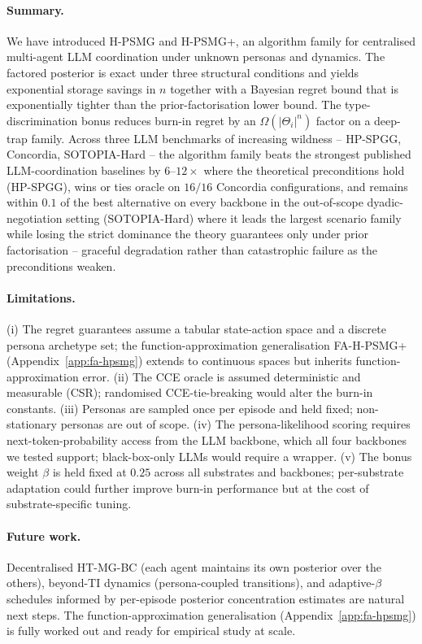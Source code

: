 ﻿\documentclass{article}
\def\textsuperscript#1{#1}%
\begin{document}
\paragraph{Summary.} We have introduced H-PSMG and H-PSMG\textsuperscript{+}, an algorithm family for centralised multi-agent LLM coordination under unknown personas and dynamics. The factored posterior is exact under three structural conditions and yields exponential storage savings in $n$ together with a Bayesian regret bound that is exponentially tighter than the prior-factorisation lower bound. The type-discrimination bonus reduces burn-in regret by an $\Omega(|\Theta_i|^n)$ factor on a deep-trap family. Across three LLM benchmarks of increasing wildness -- HP-SPGG, Concordia, SOTOPIA-Hard -- the algorithm family beats the strongest published LLM-coordination baselines by $6$--$12\times$ where the theoretical preconditions hold (HP-SPGG), wins or ties oracle on $16/16$ Concordia configurations, and remains within $0.1$ of the best alternative on every backbone in the out-of-scope dyadic-negotiation setting (SOTOPIA-Hard) where it leads the largest scenario family while losing the strict dominance the theory guarantees only under prior factorisation -- graceful degradation rather than catastrophic failure as the preconditions weaken.

\paragraph{Limitations.} (i) The regret guarantees assume a tabular state-action space and a discrete persona archetype set; the function-approximation generalisation FA-H-PSMG\textsuperscript{+} (Appendix~\ref{app:fa-hpsmg}) extends to continuous spaces but inherits function-approximation error. (ii) The CCE oracle is assumed deterministic and measurable (CSR); randomised CCE-tie-breaking would alter the burn-in constants. (iii) Personas are sampled once per episode and held fixed; non-stationary personas are out of scope. (iv) The persona-likelihood scoring requires next-token-probability access from the LLM backbone, which all four backbones we tested support; black-box-only LLMs would require a wrapper. (v) The bonus weight $\beta$ is held fixed at $0.25$ across all substrates and backbones; per-substrate adaptation could further improve burn-in performance but at the cost of substrate-specific tuning.

\paragraph{Future work.} Decentralised HT-MG-BC (each agent maintains its own posterior over the others), beyond-TI dynamics (persona-coupled transitions), and adaptive-$\beta$ schedules informed by per-episode posterior concentration estimates are natural next steps. The function-approximation generalisation (Appendix~\ref{app:fa-hpsmg}) is fully worked out and ready for empirical study at scale.




\appendix


\end{document}
